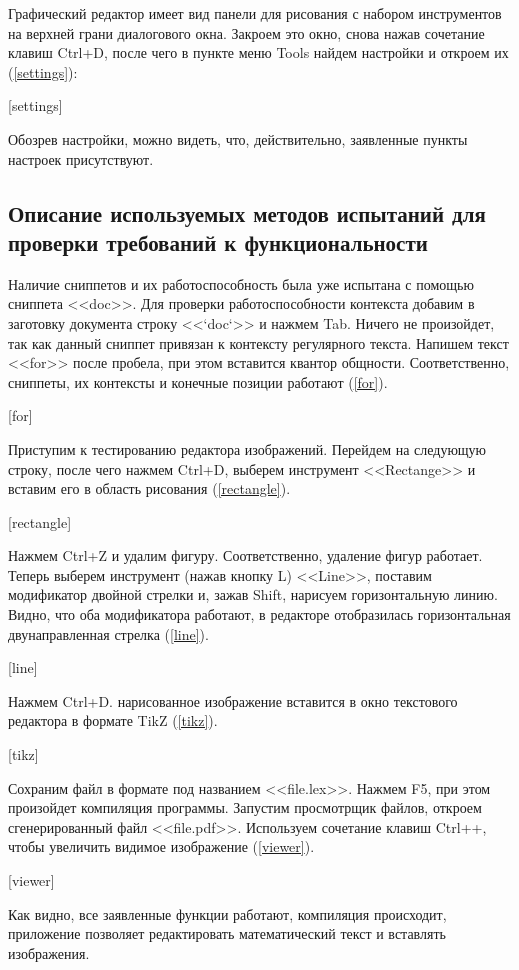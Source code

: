 \documentclass[testmethods]{espd}
\begin{document}
Графический редактор имеет вид панели для рисования с набором инструментов на верхней грани диалогового окна. Закроем это окно, снова нажав сочетание клавиш Ctrl+D, после чего в пункте меню Tools найдем настройки и откроем их (\ref{settings}):

[settings]

Обозрев настройки, можно видеть, что, действительно, заявленные пункты настроек присутствуют.

\subsection{Описание используемых методов испытаний для проверки требований к функциональности}

Наличие сниппетов и их работоспособность была уже испытана с помощью сниппета <<doc>>. Для проверки работоспособности контекста добавим в заготовку документа строку <<`doc`>> и нажмем Tab. Ничего не произойдет, так как данный сниппет привязан к контексту регулярного текста. Напишем текст <<for>> после пробела, при этом вставится квантор общности. Соответственно, сниппеты, их контексты и конечные позиции работают (\ref{for}).

[for]

Приступим к тестированию редактора изображений. Перейдем на следующую строку, после чего нажмем Ctrl+D, выберем инструмент <<Rectange>> и вставим его в область рисования (\ref{rectangle}).

[rectangle]

Нажмем Ctrl+Z и удалим фигуру. Соответственно, удаление фигур работает. Теперь выберем инструмент (нажав кнопку L) <<Line>>, поставим модификатор двойной стрелки и, зажав Shift, нарисуем горизонтальную линию. Видно, что оба модификатора работают, в редакторе отобразилась горизонтальная двунаправленная стрелка (\ref{line}).

[line]

Нажмем Ctrl+D. нарисованное изображение вставится в окно текстового редактора в формате TikZ (\ref{tikz}).

[tikz]

Сохраним файл в формате под названием <<file.lex>>. Нажмем F5, при этом произойдет компиляция программы. Запустим просмотрщик файлов, откроем сгенерированный файл <<file.pdf>>. Используем сочетание клавиш Ctrl++, чтобы увеличить видимое изображение (\ref{viewer}).

[viewer]

Как видно, все заявленные функции работают, компиляция происходит, приложение позволяет редактировать математический текст и вставлять изображения.


\end{document}
